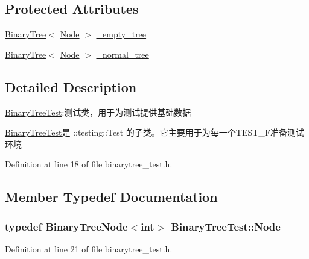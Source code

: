 \subsection*{Protected Attributes}
\begin{DoxyCompactItemize}
\item 
\hyperlink{struct_introdunction_to_algorithm_1_1_tree_algorithm_1_1_binary_tree}{Binary\+Tree}$<$ \hyperlink{class_binary_tree_test_ad4aa3d3d01bf0b1b820fffa58e81e15b}{Node} $>$ \hyperlink{class_binary_tree_test_a66e48418e5449b663b2608f4914100d5}{\+\_\+empty\+\_\+tree}
\item 
\hyperlink{struct_introdunction_to_algorithm_1_1_tree_algorithm_1_1_binary_tree}{Binary\+Tree}$<$ \hyperlink{class_binary_tree_test_ad4aa3d3d01bf0b1b820fffa58e81e15b}{Node} $>$ \hyperlink{class_binary_tree_test_a36a98db1094f92c94b7d7893c8975f57}{\+\_\+normal\+\_\+tree}
\end{DoxyCompactItemize}


\subsection{Detailed Description}
\hyperlink{class_binary_tree_test}{Binary\+Tree\+Test}\+:测试类，用于为测试提供基础数据 

{\ttfamily \hyperlink{class_binary_tree_test}{Binary\+Tree\+Test}}是 {\ttfamily \+::testing\+::\+Test} 的子类。它主要用于为每一个{\ttfamily T\+E\+S\+T\+\_\+\+F}准备测试环境 

Definition at line 18 of file binarytree\+\_\+test.\+h.



\subsection{Member Typedef Documentation}
\hypertarget{class_binary_tree_test_ad4aa3d3d01bf0b1b820fffa58e81e15b}{}
\subsubsection[{Node}]{\setlength{\rightskip}{0pt plus 5cm}typedef {\bf Binary\+Tree\+Node}$<$int$>$ {\bf Binary\+Tree\+Test\+::\+Node}}\label{class_binary_tree_test_ad4aa3d3d01bf0b1b820fffa58e81e15b}


Definition at line 21 of file binarytree\+\_\+test.\+h.



